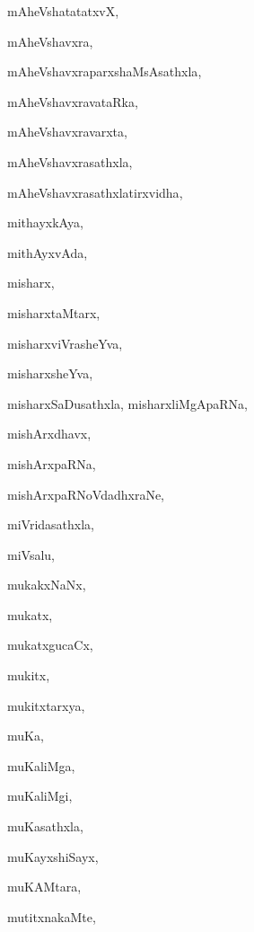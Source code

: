 \begin{multicols}{2}
{mAheVshatatatxvX}, \pageref{mAheVshatatatxvX}

{mAheVshavxra}, \pageref{mAheVshavxra}

{mAheVshavxraparxshaMsAsathxla}, \pageref{mAheVshavxraparxshaMsAsathxla}

{mAheVshavxravataRka}, \pageref{mAheVshavxravataRka}

{mAheVshavxravarxta}, \pageref{mAheVshavxravarxta}

{mAheVshavxrasathxla}, \pageref{mAheVshavxrasathxla}

{mAheVshavxrasathxlatirxvidha}, \pageref{mAheVshavxrasathxlatirxvidha}

{mithayxkAya}, \pageref{mithayxkAya}

{mithAyxvAda}, \pageref{mithAyxvAda}

{misharx}, \pageref{misharx}

{misharxtaMtarx}, \pageref{misharxtaMtarx}

{misharxviVrasheYva}, \pageref{misharxviVrasheYva}

{misharxsheYva}, \pageref{misharxsheYva}

{misharxSaDusathxla, misharxliMgApaRNa}, \pageref{misharxSaDusathxla, misharxliMgApaRNa}

{mishArxdhavx}, \pageref{mishArxdhavx}

{mishArxpaRNa}, \pageref{mishArxpaRNa}

{mishArxpaRNoVdadhxraNe}, \pageref{mishArxpaRNoVdadhxraNe}

{miVridasathxla}, \pageref{miVridasathxla}

{miVsalu}, \pageref{miVsalu}

{mukakxNaNx}, \pageref{mukakxNaNx}

{mukatx}, \pageref{mukatx}

{mukatxgucaCx}, \pageref{mukatxgucaCx}

{mukitx}, \pageref{mukitx}

{mukitxtarxya}, \pageref{mukitxtarxya}

{muKa}, \pageref{muKa}

{muKaliMga}, \pageref{muKaliMga}

{muKaliMgi}, \pageref{muKaliMgi}

{muKasathxla}, \pageref{muKasathxla}

{muKayxshiSayx}, \pageref{muKayxshiSayx}

{muKAMtara}, \pageref{muKAMtara}

{mutitxnakaMte}, \pageref{mutitxnakaMte}


\end{multicols}
